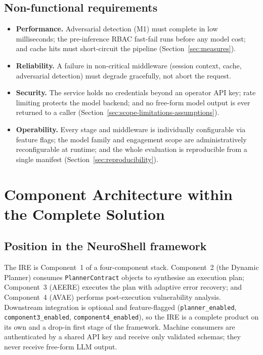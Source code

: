 \subsection*{Non-functional requirements}

\begin{itemize}
\item \textbf{Performance.} Adversarial detection (M1) must complete in low
milliseconds; the pre-inference RBAC fast-fail runs before any model cost; and
cache hits must short-circuit the pipeline (Section~\ref{sec:measures}).
\item \textbf{Reliability.} A failure in non-critical middleware (session
context, cache, adversarial detection) must degrade gracefully, not abort the
request.
\item \textbf{Security.} The service holds no credentials beyond an operator
API key; rate limiting protects the model backend; and no free-form model
output is ever returned to a caller (Section~\ref{sec:scope-limitations-assumptions}).
\item \textbf{Operability.} Every stage and middleware is individually
configurable via feature flags; the model family and engagement scope are
administratively reconfigurable at runtime; and the whole evaluation is
reproducible from a single manifest (Section~\ref{sec:reproducibility}).
\end{itemize}


\section{Component Architecture within the Complete Solution}\label{sec:component-architecture}

\subsection*{Position in the NeuroShell framework}

The IRE is Component~1 of a four-component stack. Component~2 (the Dynamic
Planner) consumes \texttt{PlannerContract} objects to synthesise an execution
plan; Component~3 (AEERE) executes the plan with adaptive error recovery; and
Component~4 (AVAE) performs post-execution vulnerability analysis. Downstream
integration is optional and feature-flagged
(\texttt{planner\_enabled}, \texttt{component3\_enabled},
\texttt{component4\_enabled}), so the IRE is a complete product on its own and
a drop-in first stage of the framework. Machine consumers are authenticated by
a shared API key and receive only validated schemas; they never receive
free-form LLM output.

